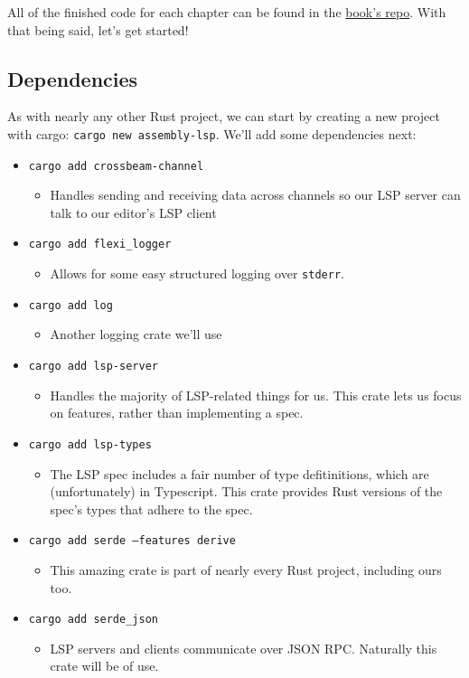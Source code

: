 All of the finished code for each chapter can be found in the \href{\URL}{book's repo}. 
With that being said, let's get started!

\subsection{Dependencies}

As with nearly any other Rust project, we can start by creating a new project with
cargo: \texttt{cargo new assembly-lsp}. We'll add some dependencies next:

\begin{itemize}
	\item \texttt{cargo add crossbeam-channel}
	      \begin{itemize}
		      \item Handles sending and receiving data across channels so our LSP server
		            can talk to our editor's LSP client
	      \end{itemize}
	\item \texttt{cargo add flexi\_logger}
	      \begin{itemize}
		      \item Allows for some easy structured logging over \texttt{stderr}.
	      \end{itemize}
	\item \texttt{cargo add log}
	      \begin{itemize}
		      \item Another logging crate we'll use
	      \end{itemize}
	\item \texttt{cargo add lsp-server}
	      \begin{itemize}
		      \item Handles the majority of LSP-related things for us. This crate
		            lets us focus on features, rather than implementing a spec.
	      \end{itemize}
	\item \texttt{cargo add lsp-types}
	      \begin{itemize}
		      \item The LSP spec includes a fair number of type defitinitions, which
		            are (unfortunately) in Typescript. This crate provides Rust versions
		            of the spec's types that adhere to the spec.
	      \end{itemize}
	\item \texttt{cargo add serde --features derive}
	      \begin{itemize}
		      \item This amazing crate is part of nearly every Rust project, including
		            ours too.
	      \end{itemize}
	\item \texttt{cargo add serde\_json}
	      \begin{itemize}
		      \item LSP servers and clients communicate over JSON RPC. Naturally this
		            crate will be of use.
	      \end{itemize}
\end{itemize}

